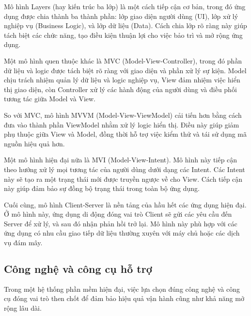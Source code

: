        Mô hình Layers (hay kiến trúc ba lớp) là một cách tiếp cận cơ bản, trong đó ứng dụng được chia thành ba thành phần: lớp giao diện người dùng (UI), lớp xử lý nghiệp vụ (Business Logic), và lớp dữ liệu (Data). Cách chia lớp rõ ràng này giúp tách biệt các chức năng, tạo điều kiện thuận lợi cho việc bảo trì và mở rộng ứng dụng.
      
        \vspace{0.5em}
      
        Một mô hình quen thuộc khác là MVC (Model-View-Controller), trong đó phần dữ liệu và logic được tách biệt rõ ràng với giao diện và phần xử lý sự kiện. Model chịu trách nhiệm quản lý dữ liệu và logic nghiệp vụ, View đảm nhiệm việc hiển thị giao diện, còn Controller xử lý các hành động của người dùng và điều phối tương tác giữa Model và View.
      
        \vspace{0.5em}
      
        So với MVC, mô hình MVVM (Model-View-ViewModel) cải tiến hơn bằng cách đưa vào thành phần ViewModel nhằm xử lý logic hiển thị. Điều này giúp giảm phụ thuộc giữa View và Model, đồng thời hỗ trợ việc kiểm thử và tái sử dụng mã nguồn hiệu quả hơn.
      
        \vspace{0.5em}
      
        Một mô hình hiện đại nữa là MVI (Model-View-Intent). Mô hình này tiếp cận theo hướng xử lý mọi tương tác của người dùng dưới dạng các Intent. Các Intent này sẽ tạo ra một trạng thái mới được truyền ngược về cho View. Cách tiếp cận này giúp đảm bảo sự đồng bộ trạng thái trong toàn bộ ứng dụng.
      
        \vspace{0.5em}
      
        Cuối cùng, mô hình Client-Server là nền tảng của hầu hết các ứng dụng hiện đại. Ở mô hình này, ứng dụng di động đóng vai trò Client sẽ gửi các yêu cầu đến Server để xử lý, và sau đó nhận phản hồi trở lại. Mô hình này phù hợp với các ứng dụng có nhu cầu giao tiếp dữ liệu thường xuyên với máy chủ hoặc các dịch vụ đám mây.
      

    \subsection{Công nghệ và công cụ hỗ trợ}
    \renewcommand{\labelitemi}{--}
    
    Trong một hệ thống phần mềm hiện đại, việc lựa chọn đúng công nghệ và công cụ đóng vai trò then chốt để đảm bảo hiệu quả vận hành cũng như khả năng mở rộng lâu dài.

